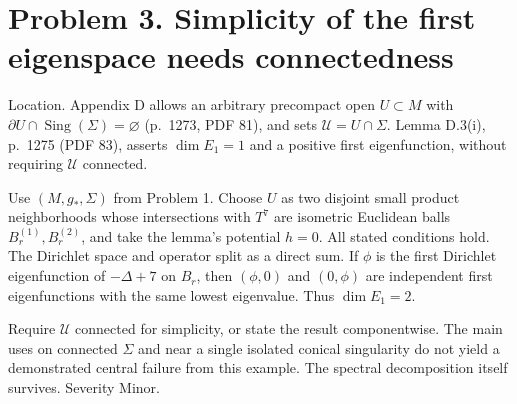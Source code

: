 \documentclass[10pt]{article}
\begin{document}
\section*{Problem 3. Simplicity of the first eigenspace needs connectedness}
Location. Appendix D allows an arbitrary precompact open \(U\subset M\) with \(\partial U\cap\operatorname{Sing}(\Sigma)=\varnothing\) (p. 1273, PDF 81), and sets \(\mathcal U=U\cap\Sigma\). Lemma D.3(i), p. 1275 (PDF 83), asserts \(\dim E_1=1\) and a positive first eigenfunction, without requiring \(\mathcal U\) connected.\par
Use \((M,g_*,\Sigma)\) from Problem 1. Choose \(U\) as two disjoint small product neighborhoods whose intersections with \(T^7\) are isometric Euclidean balls \(B_r^{(1)},B_r^{(2)}\), and take the lemma’s potential \(h=0\). All stated conditions hold. The Dirichlet space and operator split as a direct sum. If \(\phi\) is the first Dirichlet eigenfunction of \(-\Delta+7\) on \(B_r\), then \((\phi,0)\) and \((0,\phi)\) are independent first eigenfunctions with the same lowest eigenvalue. Thus \(\dim E_1=2\).\par
Require \(\mathcal U\) connected for simplicity, or state the result componentwise. The main uses on connected \(\Sigma\) and near a single isolated conical singularity do not yield a demonstrated central failure from this example. The spectral decomposition itself survives. Severity Minor.\par
\end{document}
